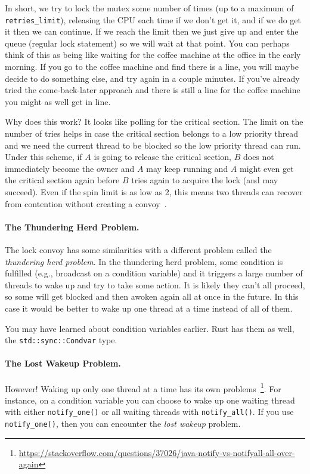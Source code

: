 In short, we try to lock the mutex some number of times (up to a maximum of \texttt{retries\_limit}), releasing the CPU each time if we don't get it, and if we do get it then we can continue. If we reach the limit then we just give up and enter the queue (regular lock statement) so we will wait at that point. You can perhaps think of this as being like waiting for the coffee machine at the office in the early morning. If you go to the coffee machine and find there is a line, you will maybe decide to do something else, and try again in a couple minutes. If you've already tried the come-back-later approach and there is still a line for the coffee machine you might as well get in line.

Why does this work? It looks like polling for the critical section. The limit on the number of tries helps in case the critical section belongs to a low priority thread and we need the current thread to be blocked so the low priority thread can run. Under this scheme, if $A$ is going to release the critical section, $B$ does not immediately become the owner and $A$ may keep running and $A$ might even get the critical section again before $B$ tries again to acquire the lock (and may succeed). Even if the spin limit is as low as 2, this means two threads can recover from contention without creating a convoy~\cite{lockconvoys}. 

\paragraph{The Thundering Herd Problem.} The lock convoy has some similarities with a different problem called the \textit{thundering herd problem}. In the thundering herd problem, some condition is fulfilled (e.g., broadcast on a condition variable) and it triggers a large number of threads to wake up and try to take some action. It is likely they can't all proceed, so some will get blocked and then awoken again all at once in the future. In this case it would be better to wake up one thread at a time instead of all of them.

You may have learned about condition variables earlier. Rust has them as well, the \texttt{std::sync::Condvar} type.

\paragraph{The Lost Wakeup Problem.} However! Waking up only one thread at a time has its own problems~\footnote{\url{https://stackoverflow.com/questions/37026/java-notify-vs-notifyall-all-over-again}}. For instance, on a condition variable you can choose to wake up one waiting thread with either \texttt{notify\_one()} or all waiting threads with \texttt{notify\_all()}. If you use \texttt{notify\_one()}, then you can encounter the \textit{lost wakeup} problem.

